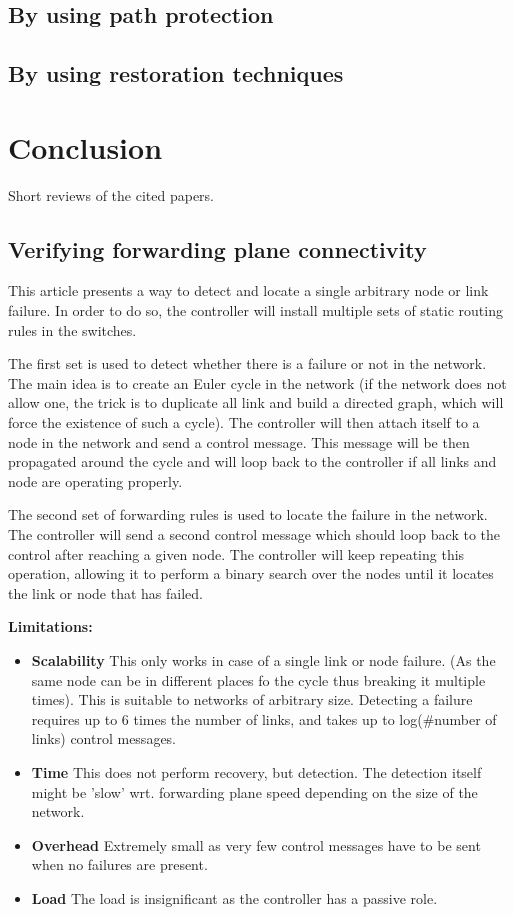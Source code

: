 \documentclass[compsoc]{IEEEtran}
\begin{document}
\subsection{By using path protection}

\subsection{By using restoration techniques}

\section{Conclusion}


\nocite{*}


\appendix
Short reviews of the cited papers.
\subsection{Verifying forwarding plane connectivity \cite{2013arXiv1308.4465K}}
This article presents a way to detect and locate a single arbitrary node or link failure.
In order to do so, the controller will install multiple sets of static routing rules in the switches.

The first set is used to detect whether there is a failure or not in the network.
The main idea is to create an Euler cycle in the network (if the network does not allow one, the trick is to duplicate all link and build a directed graph, which will force the existence of such a cycle). The controller will then attach itself to a node in the network and send a control message. This message will be then propagated around the cycle and will loop back to the controller if all links and node are operating properly.

The second set of forwarding rules is used to locate the failure in the network. The controller will send a second control message which should loop back to the control after reaching a given node. The controller will keep repeating this operation, allowing it to perform a binary search over the nodes until it locates the link or node that has failed.

\textbf{Limitations:}
\begin{itemize}
	\item \textbf{Scalability} This only works in case of a single link or node failure. (As the same node can be in different places fo the cycle thus breaking it multiple times). This is suitable to networks of arbitrary size. Detecting a failure requires up to 6 times the number of links, and takes up to log(\#number of links) control messages.
	\item \textbf{Time} This does not perform recovery, but detection. The detection itself might be 'slow' wrt. forwarding plane speed depending on the size of the network.
	\item \textbf{Overhead} Extremely small as very few control messages have to be sent when no failures are present.
	\item \textbf{Load} The load is insignificant as the controller has a passive role.
\end{itemize}
\end{document}
